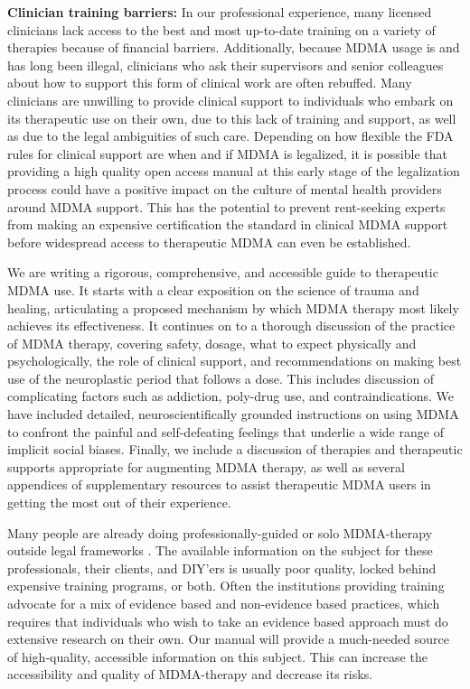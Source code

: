\documentclass[12pt,letterpaper]{book}
\begin{document}
\textbf{Clinician training barriers:} In our professional experience, many licensed clinicians lack access to the best and most up-to-date training on a variety of therapies because of financial barriers. Additionally, because MDMA usage is and has long been illegal, clinicians who ask their supervisors and senior colleagues about how to support this form of clinical work are often rebuffed. Many clinicians are unwilling to provide clinical support to individuals who embark on its therapeutic use on their own, due to this lack of training and support, as well as due to the legal ambiguities of such care. Depending on how flexible the FDA rules for clinical support are when and if MDMA is legalized, it is possible that providing a high quality open access manual at this early stage of the legalization process could have a positive impact on the culture of mental health providers around MDMA support. This has the potential to prevent rent-seeking experts from making an expensive certification the standard in clinical MDMA support before widespread access to therapeutic MDMA can even be established.

We are writing a rigorous, comprehensive, and accessible guide to therapeutic MDMA use. It starts with a clear exposition on the science of trauma and healing, articulating a proposed mechanism by which MDMA therapy most likely achieves its effectiveness. It continues on to a thorough discussion of the practice of MDMA therapy, covering safety, dosage, what to expect physically and psychologically, the role of clinical support, and recommendations on making best use of the neuroplastic period that follows a dose. This includes discussion of complicating factors such as addiction, poly-drug use, and contraindications. We have included detailed, neuroscientifically grounded instructions on using MDMA to confront the painful and self-defeating feelings that underlie a wide range of implicit social biases. Finally, we include a discussion of therapies and therapeutic supports appropriate for augmenting MDMA therapy, as well as several appendices of supplementary resources to assist therapeutic MDMA users in getting the most out of their experience.

Many people are already doing professionally-guided or solo MDMA-therapy outside legal frameworks \cite{hillsSolo,passieHistory}. The available information on the subject for these professionals, their clients, and DIY'ers is usually poor quality, locked behind expensive training programs, or both. Often the institutions providing training advocate for a mix of evidence based and non-evidence based practices, which requires that individuals who wish to take an evidence based approach must do extensive research on their own. Our manual will provide a much-needed source of high-quality, accessible information on this subject. This can increase the accessibility and quality of MDMA-therapy and decrease its risks.
\end{document}
